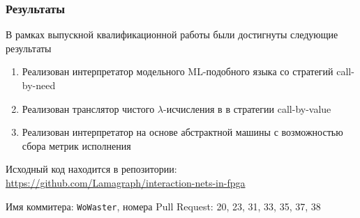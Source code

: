 \documentclass
  [ russian
  , aspectratio=169 %
  ] {beamer}
\begin{document}
\begin{frame}
    \frametitle{Результаты}
    В рамках выпускной квалификационной работы были достигнуты следующие результаты
    \begin{enumerate}
        \item Реализован интерпретатор модельного ML-подобного языка со стратегий call-by-need
        \item Реализован транслятор чистого $\lambda$-исчисления в \INs{} в стратегии call-by-value
        \item Реализован интерпретатор \INs{} на основе абстрактной машины с возможностью сбора метрик исполнения
    \end{enumerate}

    \vspace{1em}

    Исходный код находится в репозитории: \url{https://github.com/Lamagraph/interaction-nets-in-fpga}

    Имя коммитера: \texttt{WoWaster}, номера Pull Request: 20, 23, 31, 33, 35, 37, 38
\end{frame}

\appendix
\end{document}
